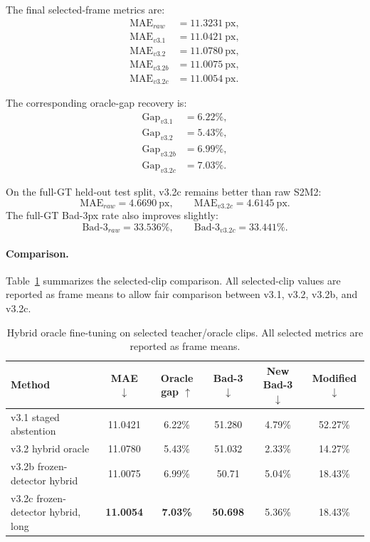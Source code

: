 \documentclass[11pt,a4paper]{article}
\begin{document}
The final selected-frame metrics are:
\[
\begin{aligned}
\mathrm{MAE}_{raw} &= 11.3231~\mathrm{px}, \\
\mathrm{MAE}_{v3.1} &= 11.0421~\mathrm{px}, \\
\mathrm{MAE}_{v3.2} &= 11.0780~\mathrm{px}, \\
\mathrm{MAE}_{v3.2b} &= 11.0075~\mathrm{px}, \\
\mathrm{MAE}_{v3.2c} &= 11.0054~\mathrm{px}.
\end{aligned}
\]

The corresponding oracle-gap recovery is:
\[
\begin{aligned}
\mathrm{Gap}_{v3.1} &= 6.22\%, \\
\mathrm{Gap}_{v3.2} &= 5.43\%, \\
\mathrm{Gap}_{v3.2b} &= 6.99\%, \\
\mathrm{Gap}_{v3.2c} &= 7.03\%.
\end{aligned}
\]

On the full-GT held-out test split, v3.2c remains better than raw S2M2:
\[
\mathrm{MAE}_{raw} = 4.6690~\mathrm{px},
\qquad
\mathrm{MAE}_{v3.2c} = 4.6145~\mathrm{px}.
\]
The full-GT Bad-3px rate also improves slightly:
\[
\mathrm{Bad}\text{-}3_{raw} = 33.536\%,
\qquad
\mathrm{Bad}\text{-}3_{v3.2c} = 33.441\%.
\]

\paragraph{Comparison.}
Table~\ref{tab:hybrid_oracle_refinement} summarizes the selected-clip comparison.
All selected-clip values are reported as frame means to allow fair comparison
between v3.1, v3.2, v3.2b, and v3.2c.

\begin{table}[t]
\centering
\caption{Hybrid oracle fine-tuning on selected teacher/oracle clips. All selected
metrics are reported as frame means.}
\label{tab:hybrid_oracle_refinement}
\begin{tabular}{lccccc}
\toprule
Method & MAE $\downarrow$ & Oracle gap $\uparrow$ & Bad-3 $\downarrow$
& New Bad-3 $\downarrow$ & Modified $\downarrow$ \\
\midrule
v3.1 staged abstention
& 11.0421 & 6.22\% & 51.280 & 4.79\% & 52.27\% \\
v3.2 hybrid oracle
& 11.0780 & 5.43\% & 51.032 & 2.33\% & 14.27\% \\
v3.2b frozen-detector hybrid
& 11.0075 & 6.99\% & 50.71 & 5.04\% & 18.43\% \\
v3.2c frozen-detector hybrid, long
& \textbf{11.0054} & \textbf{7.03\%} & \textbf{50.698}
& 5.36\% & 18.43\% \\
\bottomrule
\end{tabular}
\end{table}
\end{document}

